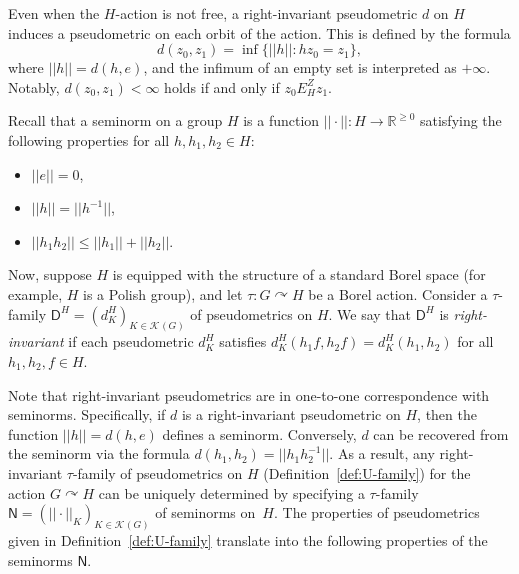 \documentclass[12pt]{paper}
\numberwithin{equation}{section}
\theoremstyle{plain}
\theoremstyle{definition}
\newcommand{\R}{\mathbb{R}}
\newcommand{\vietoris}[2][]{\mathcal{K}_{#1}(#2)}
\newcommand{\unifm}{\mathsf{D}}
\newcommand{\unifn}{\mathsf{N}}
\newcommand{\acts}{\curvearrowright}
\newcommand{\norm}[1]{||#1||}
\begin{document}
Even when the \(H\)-action is not free, a right-invariant pseudometric \(d\) on \(H\) induces a
pseudometric on each orbit of the action. This is defined by the formula
\[
  d(z_{0}, z_{1}) = \inf \{\norm{h} : hz_{0} = z_{1}\},
\]
where \(\norm{h} = d(h, e)\), and the infimum of an empty set is interpreted as
\(+\infty\). Notably, \(d(z_{0}, z_{1}) < \infty\) holds if and only if \(z_{0} E^{Z}_{H} z_{1}\).

Recall that a seminorm on a group \(H\) is a function \(\norm{\cdot} : H \to \R^{\ge 0}\) satisfying
the following properties for all \(h, h_{1}, h_{2} \in H\):
\begin{itemize}
\item \(\norm{e} = 0\),
\item \(\norm{h} = \norm{h^{-1}}\),
\item \(\norm{h_{1} h_{2}} \le \norm{h_{1}} + \norm{h_{2}}\).
\end{itemize}

Now, suppose \(H\) is equipped with the structure of a standard Borel space (for example, \(H\) is a
Polish group), and let \(\tau : G \acts H\) be a Borel action. Consider a \(\tau\)-family
\(\unifm^{H} = (d^{H}_{K})_{K \in \vietoris{G}}\) of pseudometrics on \(H\). We say that
\(\unifm^{H}\) is \emph{right-invariant} if each pseudometric \(d^{H}_{K}\) satisfies
\(d^{H}_{K}(h_{1}f, h_{2}f) = d^{H}_{K}(h_{1},h_{2})\)
for all \(h_{1}, h_{2}, f \in H\).

Note that right-invariant pseudometrics are in one-to-one correspondence with
seminorms. Specifically, if \(d\) is a right-invariant pseudometric on \(H\), then the function
\(\norm{h} = d(h,e)\) defines a seminorm. Conversely, \(d\) can be recovered from the seminorm via
the formula \(d(h_{1},h_{2}) = \norm{h_{1}h_{2}^{-1}}\). As a result, any right-invariant
\(\tau\)-family of pseudometrics on \(H\) (Definition~\ref{def:U-family}) for the action
\(G \acts H\) can be uniquely determined by specifying a \(\tau\)-family
\(\unifn = (\norm{\cdot}_{K})_{K \in \vietoris{G}}\) of seminorms on~\(H\).  The properties of
pseudometrics given in Definition~\ref{def:U-family} translate into the following properties of the
seminorms \(\unifn\).
\end{document}
